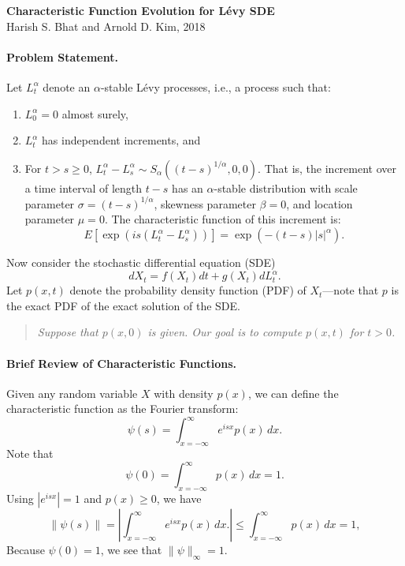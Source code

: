\documentclass[11pt,letterpaper]{article}
\begin{document}
\begin{center}
\textbf{Characteristic Function Evolution for L\'{e}vy SDE}\\
Harish S. Bhat and Arnold D. Kim, 2018
\end{center}

\paragraph{Problem Statement.} Let $L_t^{\alpha}$ denote an $\alpha$-stable L\'{e}vy processes, i.e., a process such that:
\begin{enumerate}
\item $L_0^\alpha = 0$ almost surely,
\item $L_t^\alpha$ has independent increments, and
\item For $t > s \geq 0$, $L_t^\alpha - L_s^\alpha \sim S_\alpha((t-s)^{1/\alpha},0,0)$.  That is, the increment over a time interval of length $t-s$ has an $\alpha$-stable distribution with scale parameter $\sigma = (t-s)^{1/\alpha}$, skewness parameter $\beta=0$, and location parameter $\mu=0$.  The characteristic function of this increment is:
\begin{equation}
\label{eqn:cfinc}
E[\exp(i s (L_t^\alpha - L_s^\alpha))] = \exp(-(t-s) |s|^\alpha).
\end{equation}
\end{enumerate}

\noindent Now consider the stochastic differential equation (SDE)
\begin{equation}
\label{eqn:sde}
dX_t = f(X_t) dt + g(X_t) dL_t^{\alpha}.
\end{equation}
Let $p(x,t)$ denote the probability density function (PDF) of $X_t$---note that $p$ is the exact PDF of the exact solution of the SDE.

\begin{quote}
\emph{Suppose that $p(x,0)$ is given.  Our goal is to compute $p(x,t)$ for $t > 0$.}
\end{quote}

\paragraph{Brief Review of Characteristic Functions.} Given any random variable $X$ with density $p(x)$, we can define the characteristic function as the Fourier transform:
\[
\psi(s) = \int_{x=-\infty}^\infty e^{i s x} p(x) \, dx.
\]
Note that
\[
\psi(0) = \int_{x=-\infty}^\infty p(x) \, dx = 1.
\]
Using $|e^{i s x}| = 1$ and $p(x) \geq 0$, we have
\[
\| \psi(s) \| = \left| \int_{x=-\infty}^\infty e^{i s x} p(x) \, dx. \right| \leq \int_{x=-\infty}^\infty p(x) \, dx = 1,
\]
Because $\psi(0) = 1$, we see that $\|\psi \|_\infty = 1$.
\end{document}
